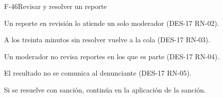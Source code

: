 \begin{prototipocrud}{F-46}{Revisar y resolver un reporte}
{\begin{crudlista}
    \item Un reporte en revisión lo atiende un solo moderador (\mbox{DES-17} \mbox{RN-02}).
    \item A los treinta minutos sin resolver vuelve a la cola (\mbox{DES-17} \mbox{RN-03}).
    \item Un moderador no revisa reportes en los que es parte (\mbox{DES-17} \mbox{RN-04}).
    \item El resultado no se comunica al denunciante (\mbox{DES-17} \mbox{RN-05}).
    \item Si se resuelve con sanción, continúa en la aplicación de la sanción.
  \end{crudlista}}
\end{prototipocrud}

